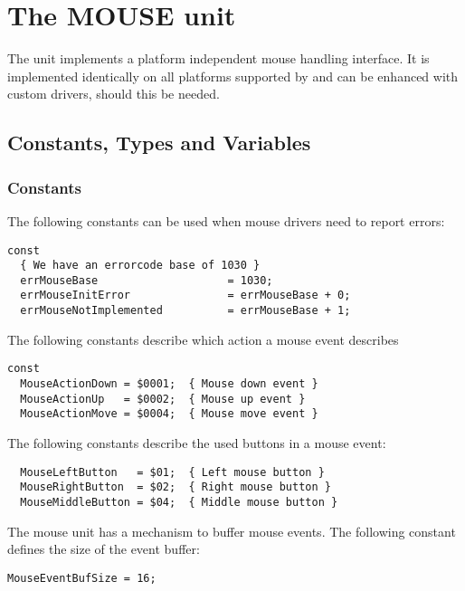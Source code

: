 %
%
%
%
%
%
\chapter{The MOUSE unit}
The  unit implements a platform independent mouse handling 
interface. It is implemented identically on all platforms supported by 
\fpc{} and can be enhanced with custom drivers, should this be needed.

\section{Constants, Types and Variables}
\subsection{Constants}	
The following constants can be used when mouse drivers need to report 
errors:
\begin{verbatim}
const
  { We have an errorcode base of 1030 }
  errMouseBase                    = 1030;
  errMouseInitError               = errMouseBase + 0;
  errMouseNotImplemented          = errMouseBase + 1;
\end{verbatim}
The following constants describe which action a mouse event describes
\begin{verbatim}
const
  MouseActionDown = $0001;  { Mouse down event }
  MouseActionUp   = $0002;  { Mouse up event }
  MouseActionMove = $0004;  { Mouse move event }
\end{verbatim}
The following constants describe the used buttons in a mouse event:
\begin{verbatim}
  MouseLeftButton   = $01;  { Left mouse button }
  MouseRightButton  = $02;  { Right mouse button }
  MouseMiddleButton = $04;  { Middle mouse button }
\end{verbatim}
The mouse unit has a mechanism to buffer mouse events. The following
constant defines the size of the event buffer:
\begin{verbatim}
MouseEventBufSize = 16;
\end{verbatim}
